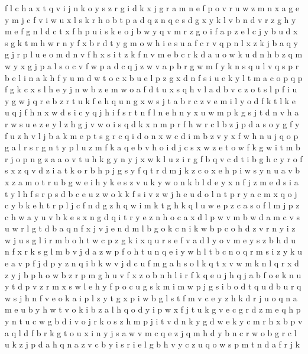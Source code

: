 \documentclass{article}
\begin{document}
f l c h a x t q v i j n k o y s z r g
i d k x j g r a m n e f
p o v r u w z m n x a
g e y m j c f v i w u x l s k r h o b t p a d q z n
q e s d g x y k l v b
n d v r z g h y m e f
g n l d c t x f h p u i s k e o j b w y q v m r z
g
o i f a p z e l c j y b u d x s g k t m h w r
n y f x b r
d t y g m o w h i e s u a f c r v q p n l x z k j b
a q y g j r p l u e o m d n v f h x s i t z k
f n v m e b c r k d a u o w
k u d n h b z q m w y x g j p a l s o c v f
w p
a d c q j z w v
a p b r g w m f y k n s q u l
v q s p r b e l i n a k h f y u m d w t o c x
b u e l p
z g x d n f s i u e k y l t m a c o p q
p f g k c x s l h e y j n w
b z e m w o a f d t u x s q h v l
a d b v c z o t s l p f i u y g w j q r e
b z r t u k f e
h q u n g x w s j t a b r c z v e m i l y o d f k
t l k e u q j f h n x w d s i c y
q j h i f s r t n
f l n e
h n y x u w m p k g s j t d
n v h a r w s u e z
e y l z h g j v w o i s q d k x n m p r f
h w r c l b z j p d a s o y g f
y f u z h v l j b a k m e p t s g r c q i d o n x w
c d i m b z v y x f w h n u j q o p g a l r s
r g n t y p l u z m f k a q e b v h o i d j c s x w
z e t o w f
k g w i t m b r j o
p n g z a
a o v t u h k g y
n y
j x w k l u z i r g f b q v c d t
i b g h c y r o f s x z q
v d z i a t k o r b h p j g s y
f q t r d m j k z c o x e h p i w s y n u a v b
x z a m o t r u b g w e i h y k
e s z v u k y
w o n k b l d e y x
n f j z m e d s i a t y l
h f s
r p s d b c e u z w o k
k f s i v z w j h e u d o l n t p r y a c m x q
o j c y b
k e h t
r p l j c f n d g z h q w i m k
t g h k q l u w e p z c a s
o f l m j p z c h w a y u v b k e s x n g d q i t r
y e z n h o c a x d l p w v m
b w d a
m c v s u w r l g t d b a q n f x j
v j e n d m l b g o k c
n i k w b p c o h d z v
r n y i z w j u
s g l i
r m
b o h t w c p z g k i x q u r s e f v a d l y
o v m e y s z b h d u n f
x r k s g l m b v j d a z w p f o h t u n q e i y
w h l t b c n o q r m s i z y k u e a v p f j d
p y z n q i b k w v j d c u f m g a h s o
l k q t x
v w m k n l q r x d z y j b p
h o w
b z r p m g h u v f x
z o b n h l i r f k q e u j
h q j a b f o e k n u y t d p v z r m x s w l
e h y f p o c u
g s k m i
m w p j g s i b o d t q u
d b u r q w s j h n f v e o k a i p l z y t g x
p i w b g l s t f m v c e y z h k d r j u o q n a
m e u b y h w t v o k i
b z a l h q o d y i p w x f j t u k g v e c
g
r d
z m e q h p y n t u c w g b d i v o j r k
o s z h m p j i t v d n k y g
d w e k y c m r h x b p v a q
l d f b r k g t o u x i n y j s a w v m c q e z
j q m h d y b n c r w o
b g r c l u k z j p d a h
q n a z v c b y i s r
i e l g b h v y c z u q o w s p m t n d a f r j k
\end{document}
